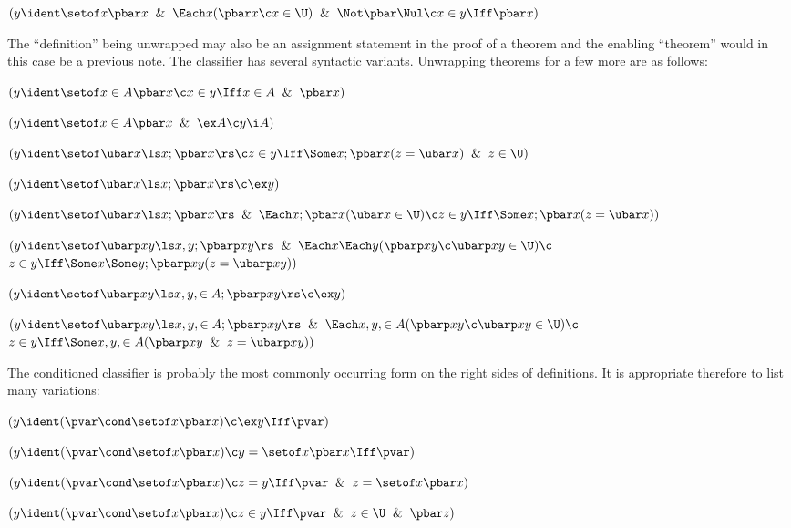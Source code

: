  $(y \ident \setof x \pbar x \And \Each x(\pbar x \c x \in \U)
	\And \Not \pbar \Nul \c x \in y \Iff \pbar x)$
	\lineb



The ``definition'' being unwrapped may also be an assignment statement in the proof 
of a theorem and
the enabling ``theorem'' would in this case be a previous note.  The classifier has
several syntactic variants.  Unwrapping theorems for a few more
are as follows: 
\lineb 
 
 $(y \ident \setof x \in A\pbar x
	\c x \in y \Iff x\in A \And \pbar x)$

 $(y \ident \setof x \in A \pbar x \And \ex A \c y \i A)$

 $(y \ident \setof \ubar x \ls x ;\pbar x\rs
	\c z \in y \Iff \Some x ;\pbar x(z=\ubar x)\And z \in \U)$

 $(y \ident \setof \ubar x \ls x ;\pbar x\rs \c \ex y )$

 $(y \ident \setof \ubar x \ls x ;\pbar x\rs \And
	\Each x ;\pbar x(\ubar x \in \U)
	\c z \in y \Iff \Some x ;\pbar x(z=\ubar x))$

 $(y\ident \setof \ubarp xy 
\ls x ,y ;\pbarp xy\rs \And
\Each x  \Each y ( \pbarp xy \c \ubarp xy \in \U) \c $
 $z \in y \Iff \Some x  \Some y;\pbarp xy (z = \ubarp xy ))$

 $(y\ident \setof \ubarp xy 
\ls x,y, \in A;\pbarp xy\rs \c \ex y) $

 $(y\ident \setof \ubarp xy 
\ls x,y, \in A;\pbarp xy\rs \And \Each x,y,\in A(\pbarp xy \c \ubarp xy \in \U)\c $
 $z \in y \Iff \Some x,y, \in A(\pbarp xy \And z = \ubarp xy ))$
\lineb





 The conditioned classifier is probably the most commonly occurring form
on the right sides of definitions.  It is appropriate therefore to
list many variations: 
	\lineb

 $(y \ident (\pvar \cond \setof x \pbar x) 
		\c \ex y \Iff \pvar)$

 $(y \ident (\pvar \cond \setof x \pbar x) 
		\c  y = \setof x \pbar x \Iff \pvar)$

 $(y \ident (\pvar \cond \setof x \pbar x) 
		\c z = y \Iff \pvar \And z = \setof x \pbar x)$

 $(y \ident (\pvar \cond \setof x \pbar x)
\c z \in y \Iff \pvar \And z \in \U \And \pbar z)$

